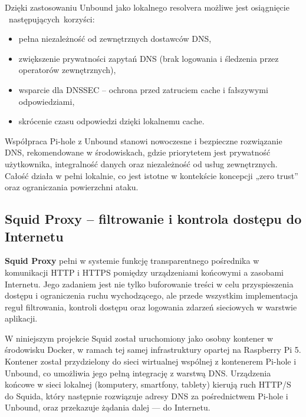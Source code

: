 \documentclass[
    left=2.5cm,         %
    right=2.5cm,        %
    top=2.5cm,          %
    bottom=3cm,         %
    bindingoffset=6mm,  %
    nohyphenation=true %
]{eiti/eiti-thesis} %
\begin{document}
Dzięki zastosowaniu Unbound jako lokalnego resolvera możliwe jest osiągnięcie ~następujących~korzyści:
\begin{itemize}
    \item pełna niezależność od zewnętrznych dostawców DNS,
    \item zwiększenie prywatności zapytań DNS (brak logowania i śledzenia przez operatorów zewnętrznych),
    \item wsparcie dla DNSSEC – ochrona przed zatruciem cache i fałszywymi odpowiedziami,
    \item skrócenie czasu odpowiedzi dzięki lokalnemu cache.
\end{itemize}

Współpraca Pi-hole z Unbound stanowi nowoczesne i bezpieczne rozwiązanie DNS, rekomendowane w środowiskach, gdzie priorytetem jest prywatność użytkownika, integralność danych oraz niezależność od usług zewnętrznych. Całość działa w pełni lokalnie, co jest istotne w kontekście koncepcji „zero trust” oraz ograniczania powierzchni ataku.

\subsection{Squid Proxy – filtrowanie i kontrola dostępu do Internetu}

\textbf{Squid Proxy}\cite{squid-docs} pełni w systemie funkcję transparentnego pośrednika w komunikacji HTTP i HTTPS pomiędzy urządzeniami końcowymi a zasobami Internetu. Jego zadaniem jest nie tylko buforowanie treści w celu przyspieszenia dostępu i ograniczenia ruchu wychodzącego, ale przede wszystkim implementacja reguł filtrowania, kontroli dostępu oraz logowania zdarzeń sieciowych w warstwie aplikacji.

W niniejszym projekcie Squid został uruchomiony jako osobny kontener w środowisku Docker, w ramach tej samej infrastruktury opartej na Raspberry Pi 5. Kontener został przydzielony do sieci wirtualnej wspólnej z kontenerem Pi-hole i Unbound, co umożliwia jego pełną integrację z warstwą DNS\cite{config-squid}. Urządzenia końcowe 
w sieci lokalnej (komputery, smartfony, tablety) kierują ruch HTTP/S do Squida, który następnie rozwiązuje adresy DNS za pośrednictwem Pi-hole i Unbound, oraz przekazuje żądania dalej — do Internetu.
\end{document}
